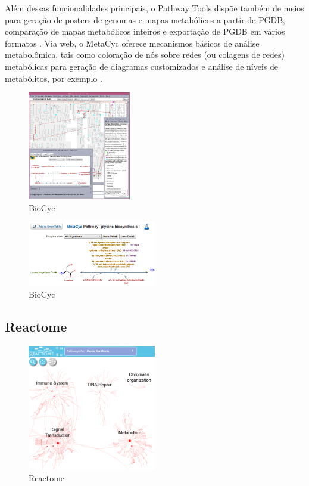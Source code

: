 \documentclass[conference]{IEEEtran}
\begin{document}
\indent Além dessas funcionalidades principais, o Pathway Tools dispõe também de meios para geração de posters de genomas e mapas metabólicos a partir de PGDB, comparação de mapas metabólicos inteiros e exportação de PGDB em vários formatos \cite{MetacycDesktopVsWeb}. Via web, o MetaCyc oferece mecanismos básicos de análise metabolômica, tais como coloração de nós sobre redes (ou colagens de redes) metabólicas para geração de diagramas customizados e análise de níveis de metabólitos, por exemplo \cite{MetacycOmicAnalysis}.

\begin{figure}[!t]
\centering
\includegraphics[width=0.4\textwidth]{biocyc-pathwaytool-desktop.png}
\caption{BioCyc}
\label{metacyc_arvore}
\end{figure}


\begin{figure}[!t]
\centering
\includegraphics[width=0.5\textwidth]{metacyc_glycin_small.png}
\caption{BioCyc}
\label{metacyc_glycin_small}
\end{figure}

\subsection{Reactome}

\begin{figure}[!t]
\centering
\includegraphics[width=0.5\textwidth]{reactome_canis_small.png}
\caption{Reactome}
\label{reactome_canis_small}
\end{figure}
\end{document}

